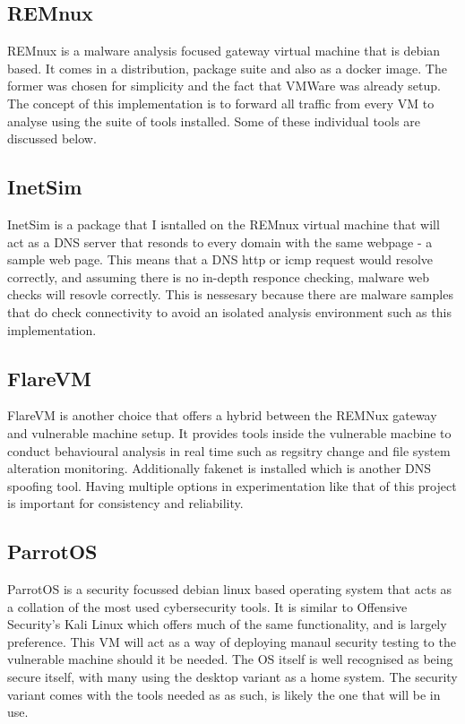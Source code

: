 \subsection{REMnux}
REMnux is a malware analysis focused gateway virtual machine that is debian based. It comes in a distribution, package suite and also as a docker image. The former was chosen for simplicity and the fact that VMWare was already setup. The concept of this implementation is to
forward all traffic from every VM to analyse using the suite of tools installed. Some of these individual tools are discussed below.
\subsection{InetSim}
InetSim is a package that I isntalled on the REMnux virtual machine that will act as a DNS server that resonds to every domain with the same webpage - a sample web page. This means that a DNS http or icmp request would resolve correctly, and assuming there is no in-depth responce checking, malware web checks will resovle correctly. 
This is nessesary because there are malware samples that do check connectivity to avoid an isolated analysis environment such as this implementation.
\subsection{FlareVM} 
FlareVM is another choice that offers a hybrid between the REMNux gateway and vulnerable machine setup. It provides tools inside the vulnerable macbine to conduct behavioural analysis in real time such as regsitry change and file system alteration monitoring. Additionally fakenet is installed which is another DNS spoofing tool. Having multiple options in experimentation like that of this project is important for consistency and reliability. 
\subsection{ParrotOS}
ParrotOS is a security focussed debian linux based operating system that acts as a collation of the most used cybersecurity tools. It is similar to Offensive Security's Kali Linux which offers much of the same functionality, and is largely preference. This VM will act as a way of deploying manaul security testing to the vulnerable machine should it be needed. The OS itself is well recognised as being secure itself, with many using the desktop variant as a home system. The security variant comes with the tools needed as as such, is likely the one that will be in use.

